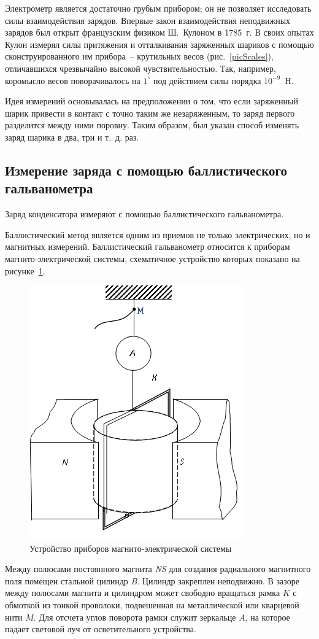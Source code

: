 \documentclass[pscyr,titlepage]{hedreport}
\begin{document}
  Электрометр является достаточно грубым прибором; он не позволяет исследовать
  силы взаимодействия зарядов. Впервые закон взаимодействия неподвижных зарядов
  был открыт французским физиком Ш.~Кулоном в 1785~г. В своих опытах Кулон
  измерял силы притяжения и отталкивания заряженных шариков с помощью
  сконструированного им прибора~-- крутильных весов (рис.~\ref{picScales}),
  отличавшихся чрезвычайно высокой чувствительностью. Так, например, коромысло
  весов поворачивалось на \( 1^\circ \) под действием силы порядка
  \( 10^{-9} \)~Н.

  Идея измерений основывалась на предположении о том, что если заряженный шарик
  привести в контакт с точно таким же незаряженным, то заряд первого разделится
  между ними поровну. Таким образом, был указан способ изменять заряд шарика в
  два, три и т.~д. раз.

  \subsection{Измерение заряда с помощью баллистического гальванометра}

  Заряд конденсатора измеряют с помощью баллистического гальванометра.

  Баллистический метод является одним из приемов не только электрических, но и
  магнитных измерений. Баллистический гальванометр относится к приборам
  магнито-электрической системы, схематичное устройство которых показано на
  рисунке~\ref{picGalv}.

  \begin{figure}[ht]
    \center
    \includegraphics[width=.4\textwidth]{sl_3_1}
    \caption{Устройство приборов магнито-электрической системы}
    \label{picGalv}
  \end{figure}

  Между полюсами постоянного магнита \emph{NS} для создания радиального
  магнитного поля помещен стальной цилиндр \emph{B}. Цилиндр закреплен
  неподвижно. В зазоре между полюсами магнита и цилиндром может свободно
  вращаться рамка \( K \) с обмоткой из тонкой проволоки, подвешенная на
  металлической или кварцевой нити \( M \). Для отсчета углов поворота рамки
  служит зеркальце \( A \), на которое падает световой луч от осветительного
  устройства.
\end{document}
